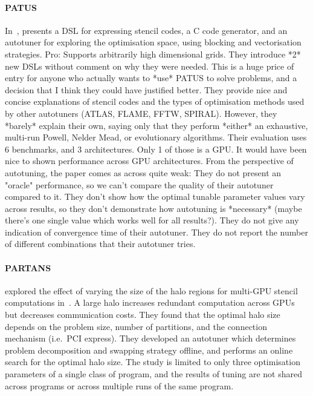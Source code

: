 \paragraph{PATUS} In~\cite{Christen2011}, \citeauthor{Christen2011}
presents a DSL for expressing stencil codes, a C code generator, and
an autotuner for exploring the optimisation space, using blocking and
vectorisation strategies. Pro: Supports arbitrarily high dimensional
grids. They introduce *2* new DSLs without comment on why they were
needed. This is a huge price of entry for anyone who actually wants to
*use* PATUS to solve problems, and a decision that I think they could
have justified better. They provide nice and concise explanations of
stencil codes and the types of optimisation methods used by other
autotuners (ATLAS, FLAME, FFTW, SPIRAL). However, they *barely*
explain their own, saying only that they perform *either* an
exhaustive, multi-run Powell, Nelder Mead, or evolutionary algorithms.
Their evaluation uses 6 benchmarks, and 3 architectures. Only 1 of
those is a GPU. It would have been nice to shown performance across
GPU architectures. From the perspective of autotuning, the paper comes
as across quite weak: They do not present an "oracle" performance, so
we can't compare the quality of their autotuner compared to it. They
don't show how the optimal tunable parameter values vary across
results, so they don't demonstrate how autotuning is *necessary*
(maybe there's one single value which works well for all
results?). They do not give any indication of convergence time of
their autotuner. They do not report the number of different
combinations that their autotuner tries.

\paragraph{PARTANS} \citeauthor{Lutz2013} explored the effect of
varying the size of the halo regions for multi-GPU stencil
computations in~\cite{Lutz2013}. A large halo increases redundant
computation across GPUs but decreases communication costs. They found
that the optimal halo size depends on the problem size, number of
partitions, and the connection mechanism (i.e.\ PCI express). They
developed an autotuner which determines problem decomposition and
swapping strategy offline, and performs an online search for the
optimal halo size. The study is limited to only three optimisation
parameters of a single class of program, and the results of tuning are
not shared across programs or across multiple runs of the same
program.
